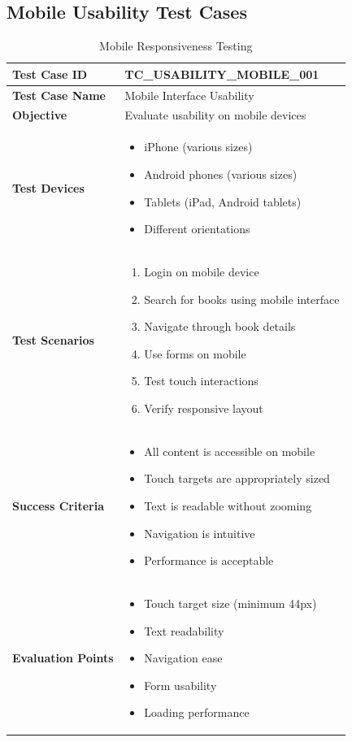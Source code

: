 \documentclass[12pt,a4paper]{article}
\begin{document}
\subsection{Mobile Usability Test Cases}

\begin{longtable}{|p{3cm}|p{12cm}|}
\caption{Mobile Responsiveness Testing} \\
\hline
\rowcolor{lightgray}
\textbf{Test Case ID} & \textbf{TC\_USABILITY\_MOBILE\_001} \\
\hline
\textbf{Test Case Name} & Mobile Interface Usability \\
\hline
\textbf{Objective} & Evaluate usability on mobile devices \\
\hline
\textbf{Test Devices} & 
\begin{itemize}[nosep]
    \item iPhone (various sizes)
    \item Android phones (various sizes)
    \item Tablets (iPad, Android tablets)
    \item Different orientations
\end{itemize} \\
\hline
\textbf{Test Scenarios} & 
\begin{enumerate}[nosep]
    \item Login on mobile device
    \item Search for books using mobile interface
    \item Navigate through book details
    \item Use forms on mobile
    \item Test touch interactions
    \item Verify responsive layout
\end{enumerate} \\
\hline
\textbf{Success Criteria} & 
\begin{itemize}[nosep]
    \item All content is accessible on mobile
    \item Touch targets are appropriately sized
    \item Text is readable without zooming
    \item Navigation is intuitive
    \item Performance is acceptable
\end{itemize} \\
\hline
\textbf{Evaluation Points} & 
\begin{itemize}[nosep]
    \item Touch target size (minimum 44px)
    \item Text readability
    \item Navigation ease
    \item Form usability
    \item Loading performance
\end{itemize} \\
\hline
\end{longtable}
\end{document}
